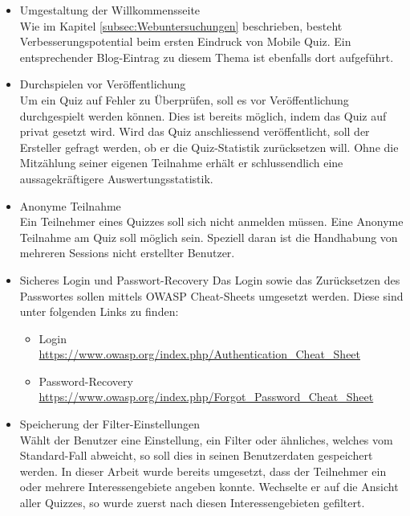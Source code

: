 \begin{itemize}
	\item Umgestaltung der Willkommensseite \\
	Wie im Kapitel \ref{subsec:Webuntersuchungen} beschrieben, besteht Verbesserungspotential beim ersten Eindruck von Mobile Quiz. Ein entsprechender Blog-Eintrag zu diesem Thema ist ebenfalls dort aufgeführt.
	
	\item Durchspielen vor Veröffentlichung \\
	Um ein Quiz auf Fehler zu Überprüfen, soll es vor Veröffentlichung durchgespielt werden können. Dies ist bereits möglich, indem das Quiz auf privat gesetzt wird.
	Wird das Quiz anschliessend veröffentlicht, soll der Ersteller gefragt werden, ob er die Quiz-Statistik zurücksetzen will. Ohne die Mitzählung seiner eigenen Teilnahme erhält er schlussendlich eine aussagekräftigere Auswertungsstatistik.
	
	\item Anonyme Teilnahme \\
	Ein Teilnehmer eines Quizzes soll sich nicht anmelden müssen. Eine Anonyme Teilnahme am Quiz soll möglich sein. Speziell daran ist die Handhabung von mehreren Sessions nicht erstellter Benutzer.
	
	\item Sicheres Login und Passwort-Recovery
	Das Login sowie das Zurücksetzen des Passwortes sollen mittels OWASP Cheat-Sheets umgesetzt werden. Diese sind unter folgenden Links zu finden:
	\begin{itemize}
		\item Login \\
		\url{https://www.owasp.org/index.php/Authentication_Cheat_Sheet}
		\item Password-Recovery \\ \url{https://www.owasp.org/index.php/Forgot_Password_Cheat_Sheet}
	\end{itemize}
	
	\item Speicherung der Filter-Einstellungen \\
	Wählt der Benutzer eine Einstellung, ein Filter oder ähnliches, welches vom Standard-Fall abweicht, so soll dies in seinen Benutzerdaten gespeichert werden. In dieser Arbeit wurde bereits umgesetzt, dass der Teilnehmer ein oder mehrere Interessengebiete angeben konnte. Wechselte er auf die Ansicht aller Quizzes, so wurde zuerst nach diesen Interessengebieten gefiltert.
	

\end{itemize}
